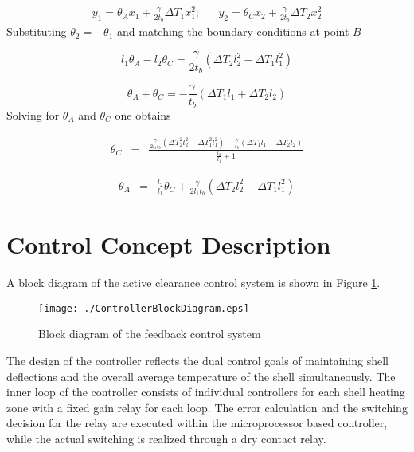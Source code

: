 \documentclass[a4paper, 10pt, conference]{ieeeconf}      %
\begin{document}
\begin{eqnarray*}
y_{1}=\theta_{A}x_{1}+\frac{\gamma}{2t_{b}}\Delta T_{1}x_{1}^{2}; &  & y_{2}=\theta_{C}x_{2}+\frac{\gamma}{2t_{b}}\Delta T_{2}x_{2}^{2}
\end{eqnarray*}
Substituting $\theta_{2}=-\theta_{1}$ and matching the boundary conditions at point $B$

\begin{equation*}
l_{1}\theta_{A}-l_{2}\theta_{C}=\frac{\gamma}{2t_{b}}\left(\Delta T_{2}l_{2}^{2}-\Delta T_{1}l_{1}^{2}\right)
\end{equation*}

\begin{equation*}
\theta_{A}+\theta_{C}=-\frac{\gamma}{t_{b}}\left(\Delta T_{1}l_{1}+\Delta T_{2}l_{2}\right)
\end{equation*}
Solving for $\theta_{A}$ and $\theta_{C}$ one obtains

\begin{eqnarray*}
\theta_{C} & = & \frac{\frac{\gamma}{2l_{1}t_{b}}\left(\Delta T_{2}^{2}l_{2}^{2}-\Delta T_{1}^{2}l_{1}^{2}\right)-\frac{\gamma}{t_{b}}\left(\Delta T_{1}l_{1}+\Delta T_{2}l_{2}\right)}{\frac{l_{2}}{l_{1}}+1}
\end{eqnarray*}

\begin{eqnarray*}
\theta_{A} & = & \frac{l_{2}}{l_{1}}\theta_{C}+\frac{\gamma}{2l_{1}t_{b}}\left(\Delta T_{2}l_{2}^{2}-\Delta T_{1}l_{1}^{2}\right)
\end{eqnarray*}

\section{Control Concept Description\label{sec:Concept-Descriptions}}
A block diagram of the active clearance control system is shown in Figure \ref{fig:Controller-Block-Diagram}. \begin{figure}
\centering{}\texttt{[image: ./ControllerBlockDiagram.eps]}
\caption{\label{fig:Controller-Block-Diagram} Block diagram of the feedback control system }
\end{figure}
The design of the controller reflects the dual control goals of maintaining shell deflections and the overall average temperature of the shell simultaneously. The inner loop of the controller consists of individual controllers for each shell heating zone with a fixed gain relay for each loop. The error calculation and the switching decision for the relay are executed within the microprocessor based controller, while the actual switching is realized through a dry contact relay. 
\end{document}

